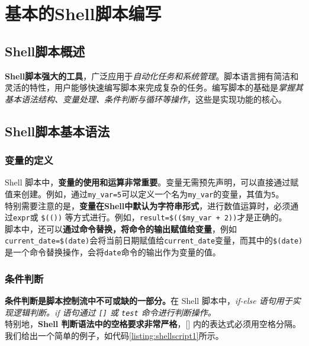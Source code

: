 \section{基本的Shell脚本编写}

\subsection{Shell脚本概述}

\textbf{Shell脚本强大的工具}，广泛应用于\textit{自动化任务和系统管理}。脚本语言拥有简洁和灵活的特性，用户能够快速编写脚本来完成复杂的任务。编写脚本的基础是\textit{掌握其基本语法结构、变量处理、条件判断与循环等操作}，这些是实现功能的核心。

\subsection{Shell脚本基本语法}

\subsubsection{变量的定义}

Shell 脚本中，\textbf{变量的使用和运算非常重要}。变量无需预先声明，可以直接通过赋值来创建。例如，通过\texttt{my\_var=5}可以定义一个名为\texttt{my\_var}的变量，其值为\texttt{5}。\\

特别需要注意的是，\textbf{变量在Shell中默认为字符串形式}，进行数值运算时，必须通过\texttt{expr}或 \texttt{\$(())} 等方式进行。例如，\texttt{result=\$((\$my\_var + 2))}才是正确的。\\

脚本中，还可以\textbf{通过命令替换，将命令的输出赋值给变量}，例如\texttt{current\_date=\$(date)}会将当前日期赋值给\texttt{current\_date}变量，而其中的\texttt{\$(date)}是一个命令替换操作，会将\texttt{date}命令的输出作为变量的值。\\

\subsubsection{条件判断}

\textbf{条件判断是脚本控制流中不可或缺的一部分。}在 Shell 脚本中，\textit{if-else 语句用于实现逻辑判断。if 语句通过 \texttt{[]} 或 \texttt{test} 命令进行判断操作。}\\

特别地，\textbf{Shell 判断语法中的空格要求非常严格}，[] 内的表达式必须用空格分隔。我们给出一个简单的例子，如代码\ref{listing:shellscript1}所示。

